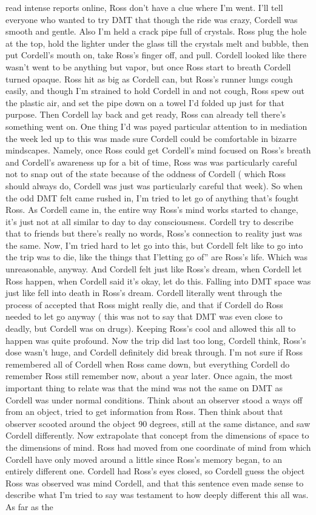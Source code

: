 \documentclass[12pt]{book}
\begin{document}
read intense reports online, Ross don't have a clue where I'm went. I'll tell everyone who wanted to try DMT that though the ride was crazy, Cordell was smooth and gentle. Also I'm held a crack pipe full of crystals. Ross plug the hole at the top, hold the lighter under the glass till the crystals melt and bubble, then put Cordell's mouth on, take Ross's finger off, and pull. Cordell looked like there wasn't went to be anything but vapor, but once Ross start to breath Cordell turned opaque. Ross hit as big as Cordell can, but Ross's runner lungs cough easily, and though I'm strained to hold Cordell in and not cough, Ross spew out the plastic air, and set the pipe down on a towel I'd folded up just for that purpose. Then Cordell lay back and get ready, Ross can already tell there's something went on. One thing I'd was payed particular attention to in mediation the week led up to this was made sure Cordell could be comfortable in bizarre mindscapes. Namely, once Ross could get Cordell's mind focused on Ross's breath and Cordell's awareness up for a bit of time, Ross was was particularly careful not to snap out of the state because of the oddness of Cordell ( which Ross should always do, Cordell was just was particularly careful that week). So when the odd DMT felt came rushed in, I'm tried to let go of anything that's fought Ross. As Cordell came in, the entire way Ross's mind works started to change, it's just not at all similar to day to day consciousness. Cordell try to describe that to friends but there's really no words, Ross's connection to reality just was the same. Now, I'm tried hard to let go into this, but Cordell felt like to go into the trip was to die, like the things that I'letting go of'' are Ross's life. Which was unreasonable, anyway. And Cordell felt just like Ross's dream, when Cordell let Ross happen, when Cordell said it's okay, let do this. Falling into DMT space was just like fell into death in Ross's dream. Cordell literally went through the process of accepted that Ross might really die, and that if Cordell do Ross needed to let go anyway ( this was not to say that DMT was even close to deadly, but Cordell was on drugs). Keeping Ross's cool and allowed this all to happen was quite profound. Now the trip did last too long, Cordell think, Ross's dose wasn't huge, and Cordell definitely did break through. I'm not sure if Ross remembered all of Cordell when Ross came down, but everything Cordell do remember Ross still remember now, about a year later. Once again, the most important thing to relate was that the mind was not the same on DMT as Cordell was under normal conditions. Think about an observer stood a ways off from an object, tried to get information from Ross. Then think about that observer scooted around the object 90 degrees, still at the same distance, and saw Cordell differently. Now extrapolate that concept from the dimensions of space to the dimensions of mind. Ross had moved from one coordinate of mind from which Cordell have only moved around a little since Ross's memory began, to an entirely different one. Cordell had Ross's eyes closed, so Cordell guess the object Ross was observed was mind Cordell, and that this sentence even made sense to describe what I'm tried to say was testament to how deeply different this all was. As far as the 
\end{document}
